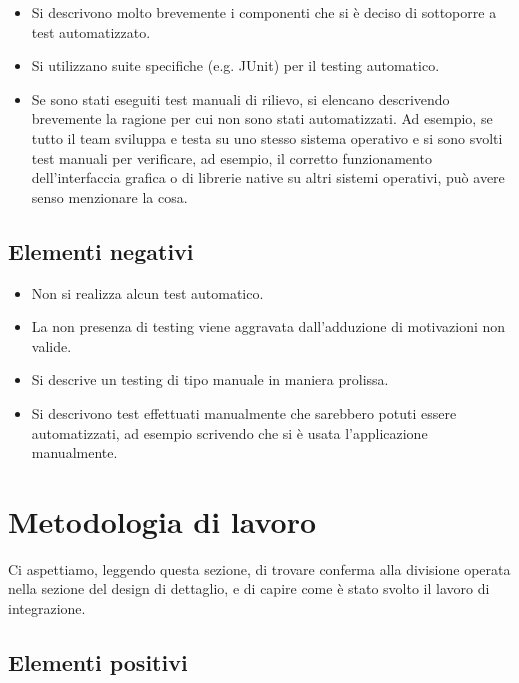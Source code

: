\documentclass[a4paper,12pt]{report}
\begin{document}
\begin{itemize}
 \item Si descrivono molto brevemente i componenti che si è deciso di sottoporre a test automatizzato.
 \item Si utilizzano suite specifiche (e.g. JUnit) per il testing automatico.
 \item Se sono stati eseguiti test manuali di rilievo, si elencano descrivendo brevemente la ragione per cui non sono stati automatizzati. Ad esempio, se tutto il team sviluppa e testa su uno stesso sistema operativo e si sono svolti test manuali per verificare, ad esempio, il corretto funzionamento dell'interfaccia grafica o di librerie native su altri sistemi operativi, può avere senso menzionare la cosa.
\end{itemize}

\subsection*{Elementi negativi}
\begin{itemize}
 \item Non si realizza alcun test automatico.
 \item La non presenza di testing viene aggravata dall'adduzione di motivazioni non valide.
 \item Si descrive un testing di tipo manuale in maniera prolissa.
 \item Si descrivono test effettuati manualmente che sarebbero potuti essere automatizzati, ad esempio scrivendo che si è usata l'applicazione manualmente.
\end{itemize}

\section{Metodologia di lavoro}

Ci aspettiamo, leggendo questa sezione, di trovare conferma alla divisione operata nella sezione del design di dettaglio, e di capire come è stato svolto il lavoro di integrazione.

\subsection*{Elementi positivi}
\end{document}
